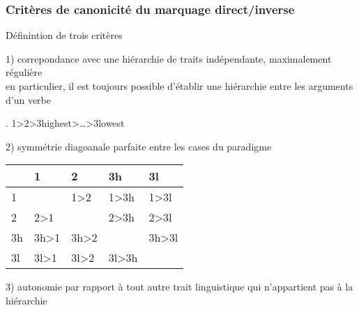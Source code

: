\begin{frame}
\frametitle{Critères de canonicité du marquage direct/inverse}
\begin{blackwideitemize}
\item Définintion de trois critères
\pause
\begin{smallwideitemize}
\item[1)] correpondance avec une hiérarchie de traits indépendante,
  maximalement régulière\\
\ra en particulier, il est toujours possible d'établir une hiérarchie
entre les arguments d'un verbe\\

\begin{center}
\ex. 1>2>{\sc 3highest}>\ldots>{\sc 3lowest}\label{ex:canhierarchy}

\end{center}

\pause
\item[2)] symmétrie diagoanale parfaite entre les cases du paradigme

\vspace*{.3cm}
\begin{tabular}{|l|llll|} 
\hline
&1 & 2 &{\sc 3h}&{\sc 3l}\\
\hline
 1 &\grise{} &1>2  & 1>{\sc 3h}&1>{\sc 3l} \\
 2&\cellcolor{infl3} 2>1 &\grise{}&2>{\sc 3h}&2>{\sc 3l}\\
 {\sc 3h}&\cellcolor{infl3} {\sc 3h}>1 &\cellcolor{infl3} {\sc 3h}>2 &\grise{}&{\sc 3h}>{\sc 3l}\\
 {\sc 3l}&\cellcolor{infl3} {\sc 3l}>1 &\cellcolor{infl3} {\sc 3l}>2 &\cellcolor{infl3} {\sc
   3l}>{\sc 3h}&\grise{}\\
\hline

\end{tabular}

\pause

\item[3)] autonomie par rapport à tout autre trait linguistique qui
  n'appartient pas à la hiérarchie
\end{smallwideitemize}
\end{blackwideitemize}

\begin{center}



\end{center}
\end{frame}